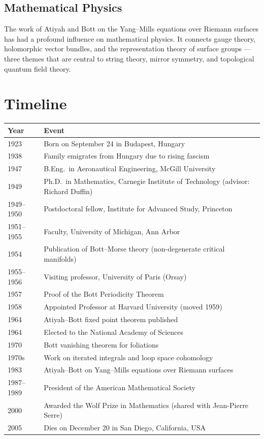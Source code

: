 \subsection{Mathematical Physics}

The work of Atiyah and Bott on the Yang--Mills equations over Riemann surfaces has had a profound influence on mathematical physics. It connects gauge theory, holomorphic vector bundles, and the representation theory of surface groups --- three themes that are central to string theory, mirror symmetry, and topological quantum field theory.

\section*{Timeline}
\begin{tabularx}{\linewidth}{|p{1.5cm}|>{\raggedright\arraybackslash}X|}
\hline
\textbf{Year} & \textbf{Event} \\ \hline
1923 & Born on September 24 in Budapest, Hungary \\ \hline
1938 & Family emigrates from Hungary due to rising fascism \\ \hline
1947 & B.Eng.\ in Aeronautical Engineering, McGill University \\ \hline
1949 & Ph.D.\ in Mathematics, Carnegie Institute of Technology (advisor: Richard Duffin) \\ \hline
1949--1950 & Postdoctoral fellow, Institute for Advanced Study, Princeton \\ \hline
1951--1955 & Faculty, University of Michigan, Ann Arbor \\ \hline
1954 & Publication of Bott--Morse theory (non-degenerate critical manifolds) \\ \hline
1955--1956 & Visiting professor, University of Paris (Orsay) \\ \hline
1957 & Proof of the Bott Periodicity Theorem \\ \hline
1958 & Appointed Professor at Harvard University (moved 1959) \\ \hline
1964 & Atiyah--Bott fixed point theorem published \\ \hline
1964 & Elected to the National Academy of Sciences \\ \hline
1970 & Bott vanishing theorem for foliations \\ \hline
1970s & Work on iterated integrals and loop space cohomology \\ \hline
1983 & Atiyah--Bott on Yang--Mills equations over Riemann surfaces \\ \hline
1987--1989 & President of the American Mathematical Society \\ \hline
2000 & Awarded the Wolf Prize in Mathematics (shared with Jean-Pierre Serre) \\ \hline
2005 & Dies on December 20 in San Diego, California, USA \\ \hline
\end{tabularx}

